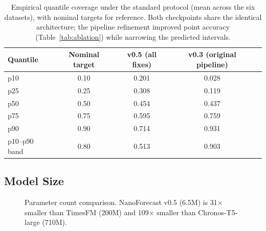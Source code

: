 \documentclass[11pt]{article}
\begin{document}
\begin{table}[t]
\centering
\caption{Empirical quantile coverage under the standard protocol (mean across the six datasets), with nominal targets for reference. Both checkpoints share the identical architecture; the pipeline refinement improved point accuracy (Table~\ref{tab:ablation}) while narrowing the predicted intervals.}
\label{tab:calibration}
\small
\begin{tabular}{lcccc}
\toprule
Quantile & Nominal target & v0.5 (all fixes) & v0.3 (original pipeline) \\
\midrule
p10         & 0.10 & 0.201 & 0.028 \\
p25         & 0.25 & 0.308 & 0.119 \\
p50         & 0.50 & 0.454 & 0.437 \\
p75         & 0.75 & 0.595 & 0.759 \\
p90         & 0.90 & 0.714 & 0.931 \\
p10--p90 band & 0.80 & 0.513 & 0.903 \\
\bottomrule
\end{tabular}
\end{table}

\subsection{Model Size}

\begin{figure}[t]
\centering
{}
\caption{Parameter count comparison. NanoForecast v0.5 (6.5M) is 31$\times$ smaller than TimesFM (200M) and 109$\times$ smaller than Chronos-T5-large (710M).}
\label{fig:params}
\end{figure}

\end{document}
